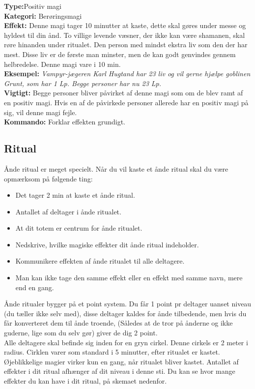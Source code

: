 \begin{åndens gave*}
\textbf{Type:}Positiv magi \\
\textbf{Kategori:} Berøringsmagi\\
\textbf{Effekt:} Denne magi tager 10 minutter at kaste, dette skal gøres under messe og hyldest til din ånd. To villige levende væsner, der ikke kan være shamanen, skal røre hinanden under ritualet. Den person med mindst ekstra liv som den der har mest. Disse liv er de første man minster, men de kan godt genvindes gennem helbredelse. Denne magi vare i 10 min.\\
\textbf{Eksempel:} \textit{Vampyr-jægeren Karl Hugtand har 23 liv og vil gerne hjælpe goblinen Grunt, som har 1
Lp. Begge personer har nu 23 Lp.}\\
\textbf{Vigtigt:} Begge personer bliver påvirket af denne magi som om de blev ramt af en positiv magi. Hvis en af de påvirkede personer allerede har en positiv magi på sig, vil denne magi fejle.\\
\textbf{Kommando:} Forklar effekten grundigt.
\end{åndens gave*}

\subsection*{Ritual}

Ånde ritual er meget specielt. Når du vil kaste et ånde ritual skal du være opmærksom på følgende ting:
\begin{itemize}
    \item Det tager 2 min at kaste et ånde ritual.
    \item Antallet af deltager i ånde ritualet.
    \item  At dit totem er centrum for ånde ritualet.
    \item Nedskrive, hvilke magiske effekter dit ånde ritual indeholder.
    \item Kommunikere effekten af ånde ritualet til alle deltagere. 
    \item Man kan ikke tage den samme effekt eller en effekt med samme navn, mere end en gang.
\end{itemize}

Ånde ritualer bygger på et point system. Du får 1 point pr deltager uanset niveau (du tæller ikke selv med), disse deltager kaldes for ånde tilbedende, men hvis du får konverteret dem til ånde troende, (Således at de tror på ånderne og ikke guderne, lige som du selv gør) giver de dig 2 point. \\
Alle deltagere skal befinde sig inden for en gryn cirkel. Denne cirkels er 2 meter i radius.
Cirklen varer som standard i 5 minutter, efter ritualet er kastet. Øjeblikkelige magier virker kun en gang, når ritualet bliver kastet. Antallet af effekter i dit ritual afhænger af dit niveau i denne sti. Du kan se hvor mange effekter du kan have i dit ritual, på skemaet nedenfor.

